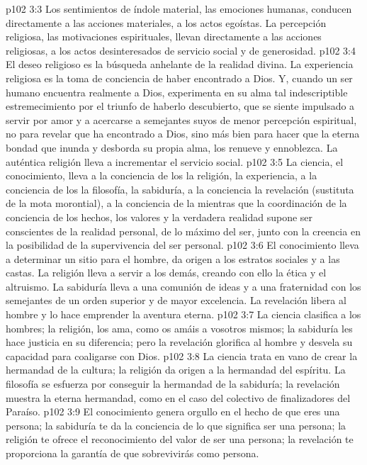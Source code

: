 \vs p102 3:3 Los sentimientos de índole material, las emociones humanas, conducen directamente a las acciones materiales, a los actos egoístas. La percepción religiosa, las motivaciones espirituales, llevan directamente a las acciones religiosas, a los actos desinteresados de servicio social y de generosidad.
\vs p102 3:4 El deseo religioso es la búsqueda anhelante de la realidad divina. La experiencia religiosa es la toma de conciencia de haber encontrado a Dios. Y, cuando un ser humano encuentra realmente a Dios, experimenta en su alma tal indescriptible estremecimiento por el triunfo de haberlo descubierto, que se siente impulsado a servir por amor y a acercarse a semejantes suyos de menor percepción espiritual, no para revelar que ha encontrado a Dios, sino más bien para hacer que la eterna bondad que inunda y desborda su propia alma, los renueve y ennoblezca. La auténtica religión lleva a incrementar el servicio social.
\vs p102 3:5 \pc La ciencia, el conocimiento, lleva a la conciencia de los  la religión, la experiencia, a la conciencia de los  la filosofía, la sabiduría, a la conciencia  la revelación (sustituta de la mota morontial), a la conciencia de la  mientras que la coordinación de la conciencia de los hechos, los valores y la verdadera realidad supone ser conscientes de la realidad personal, de lo máximo del ser, junto con la creencia en la posibilidad de la supervivencia del ser personal.
\vs p102 3:6 \pc El conocimiento lleva a determinar un sitio para el hombre, da origen a los estratos sociales y a las castas. La religión lleva a servir a los demás, creando con ello la ética y el altruismo. La sabiduría lleva a una comunión de ideas y a una fraternidad con los semejantes de un orden superior y de mayor excelencia. La revelación libera al hombre y lo hace emprender la aventura eterna.
\vs p102 3:7 La ciencia clasifica a los hombres; la religión, los ama, como os amáis a vosotros mismos; la sabiduría les hace justicia en su diferencia; pero la revelación glorifica al hombre y desvela su capacidad para coaligarse con Dios.
\vs p102 3:8 La ciencia trata en vano de crear la hermandad de la cultura; la religión da origen a la hermandad del espíritu. La filosofía se esfuerza por conseguir la hermandad de la sabiduría; la revelación muestra la eterna hermandad, como en el caso del colectivo de finalizadores del Paraíso.
\vs p102 3:9 El conocimiento genera orgullo en el hecho de que eres una persona; la sabiduría te da la conciencia de lo que significa ser una persona; la religión te ofrece el reconocimiento del valor de ser una persona; la revelación te proporciona la garantía de que sobrevivirás como persona.
